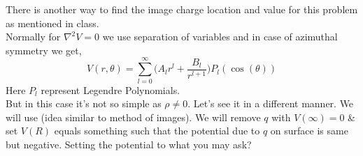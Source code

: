 \documentclass{article}
\begin{document}
\begin{note}
    There is another way to find the image charge location and value for this problem as mentioned in class.\\
    Normally for $\nabla^2 V=0$ we use separation of variables and in case of azimuthal symmetry we get,
    \begin{equation}
        V(r,\theta) = \sum_{l=0}^{\infty}\Bigg( A_l r^l + \frac{B_l}{r^{l+1}} \Bigg)P_l(\cos(\theta))
        \label{azi_pot_sym1}
    \end{equation}
    Here $P_l$ represent Legendre Polynomials.\\
    But in this case it's not so simple as $\rho \neq 0$. Let's see it in a different manner. We will use (idea similar to method of images). We will remove $q$ with $V(\infty)=0$ \& set $V(R)$ equals something such that the potential due to $q$ on surface is same but negative. Setting the potential to what you may ask?


\end{note}
\end{document}
